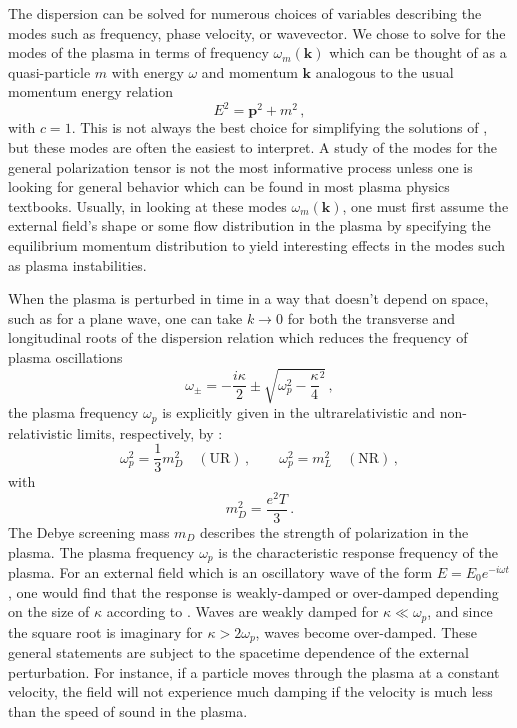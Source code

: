 The dispersion  can be solved for numerous choices of variables describing the modes such as frequency, phase velocity, or wavevector. We chose to solve for the modes of the plasma in terms of frequency $\omega_m (\mathbf{k})$ which can be thought of as a quasi-particle $m$ with energy $\omega$ and momentum $\mathbf{k}$ analogous to the usual momentum energy relation 
\begin{equation}
    E^2 = \boldsymbol{p}^2 +m^2\, ,
\end{equation}
with $c=1$. This is not always the best choice for simplifying the solutions of , but these modes are often the easiest to interpret. A study of the modes for the general polarization tensor is not the most informative process unless one is looking for general behavior which can be found in most plasma physics textbooks. Usually, in looking at these modes $\omega_m(\mathbf{k})$, one must first assume the external field's shape or some flow distribution in the plasma by specifying the equilibrium momentum distribution to yield interesting effects in the modes such as plasma instabilities.

When the plasma is perturbed in time in a way that doesn't depend on space, such as for a plane wave, one can take $k \to 0$ for both the transverse and longitudinal roots of the dispersion relation which reduces the frequency of plasma oscillations \cite{Formanek:2021blc,Grayson:2022asf}
\begin{equation}\label{plasmafreq}
    \omega_{\pm} = -\frac{i\kappa}{2} \pm \sqrt{\omega_p^2 - \frac{\kappa}{4}^2}\,,
\end{equation}
the plasma frequency $\omega_p$ is explicitly given in the ultrarelativistic and non-relativistic limits, respectively, by \cite{Formanek:2021blc}:
\begin{equation}
\omega_p^2 = \frac{1}{3} m_D^2 \quad (\mathrm{UR})\,, \qquad \omega_p^2 = m_L^2 \quad (\mathrm{NR}) \,,
\end{equation}
with
\begin{equation}
    m_D^2 = \frac{e^2 T}{3}\,.
\end{equation}
The Debye screening mass $m_D$ describes the strength of polarization in the plasma. The plasma frequency $\omega_p$ is the characteristic response frequency of the plasma. For an external field which is an oscillatory wave of the form $E=E_0e^{-i\omega t}$, one would find that the response is weakly-damped or over-damped depending on the size of $\kappa$ according to . Waves are weakly damped for $\kappa \ll \omega_p$, and since the square root is imaginary for $\kappa > 2\omega_p$, waves become over-damped. These general statements are subject to the spacetime dependence of the external perturbation. For instance, if a particle moves through the plasma at a constant velocity, the field will not experience much damping if the velocity is much less than the speed of sound in the plasma.

